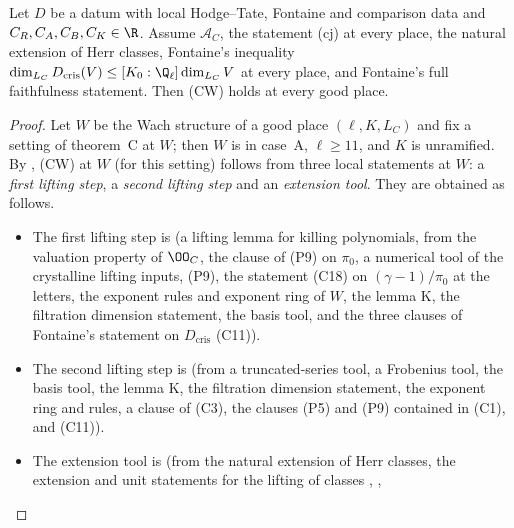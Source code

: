 \begin{proposition}\label{pf:linkN-adm:CW}
Let $D$ be a datum with local Hodge--Tate, Fontaine and comparison data and $C_R,C_A,C_B,C_K\in\R$. Assume $\mathcal A_C$,
the statement (cj) at every place, the natural extension of Herr classes, Fontaine's inequality
$\dim_{L_C}D_{\mathrm{cris}}(V)\le[K_0:\Q_\ell]\dim_{L_C}V$ at every place, and Fontaine's full faithfulness statement. Then
(CW) holds at every good place.
\end{proposition}

\begin{proof}
Let $W$ be the Wach structure of a good place $(\ell,K,L_C)$ and fix a setting of theorem~C at $W$; then $W$ is in case~A,
$\ell\ge11$, and $K$ is unramified. By ,
(CW) at $W$ (for this setting) follows from three local statements at $W$: a \emph{first lifting step}, a \emph{second lifting
step} and an \emph{extension tool}. They are obtained as follows.
\begin{itemize}
\item The first lifting step is 
  (a lifting lemma for killing polynomials, from the valuation property of $\OO_C$, the clause of (P9) on $\pi_0$, a
  numerical tool of the crystalline lifting inputs, (P9), the statement (C18) on $(\gamma-1)/\pi_0$ at the letters, the
  exponent rules and exponent ring of $W$, the lemma K, the filtration dimension statement, the basis
  tool, and the three clauses of Fontaine's statement on $D_{\mathrm{cris}}$ (C11)).
\item The second lifting step is 
  (from a truncated-series tool, a Frobenius tool, the basis tool, the lemma K, the filtration dimension statement, the
  exponent ring and rules, a clause of (C3), the clauses (P5) and (P9) contained in (C1), and (C11)).
\item The extension tool is  (from the natural
  extension of Herr classes, the extension and unit statements for the lifting of classes
  , ,

\end{itemize}
\end{proof}
